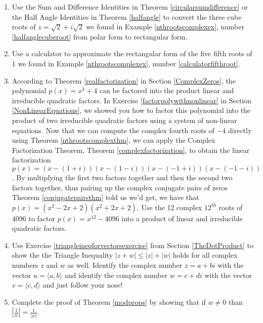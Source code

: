 \documentclass{ximera}
\begin{document}
\begin{enumerate}

\setcounter{enumi}{\value{HW}}

\item Use the Sum and Difference Identities in Theorem \ref{circularsumdifference} or the Half Angle Identities in Theorem \ref{halfangle} to convert the three cube roots of $z=\sqrt{2} + i\sqrt{2}$ we found in  Example \ref{nthrootscomplexex}, number \ref{halfanglecuberoot} from polar form to rectangular form.

\item Use a calculator to approximate the rectangular form of the five fifth roots of $1$ we found in Example \ref{nthrootscomplexex}, number \ref{calculatorfifthroot}.

\item According to Theorem \ref{realfactorization} in Section \ref{ComplexZeros}, the polynomial $p(x) = x^{4} + 4$ can be factored into the product linear and irreducible quadratic factors.  In Exercise \ref{factorpolywithnonlinear} in Section \ref{NonLinearEquations}, we showed you how to factor this polynomial into the product of two irreducible quadratic factors using a system of non-linear equations.  Now that we can compute the complex fourth roots of $-4$ directly using  Theorem \ref{nthrootscomplexthm}, we can  apply the Complex Factorization Theorem, Theorem \ref{complexfactorization}, to obtain the linear factorization $p(x) = (x - (1 + i))(x - (1 - i))(x - (-1 + i))(x - (-1 - i))$.  By multiplying the first two factors together and then the second two factors together, thus pairing up the complex conjugate pairs of zeros Theorem \ref{conjugatepairsthm} told us we'd get, we have that $p(x) = (x^{2} - 2x + 2)(x^{2} + 2x + 2)$.  Use the 12 complex $12^{\text{th}}$ roots of 4096 to factor $p(x) = x^{12} - 4096$ into a product of linear and irreducible quadratic factors.


\item Use Exercise \ref{triangleineqforvectorsexercise} from Section \ref{TheDotProduct} to show the the Triangle Inequality $|z + w| \leq |z| + |w|$ holds for all complex numbers $z$ and $w$ as well.  Identify the complex number $z = a + bi$ with the vector $u = \langle a, b \rangle$ and identify the complex number $w = c + di$ with the vector $v = \langle c, d \rangle$ and just follow your nose!


\item Complete the proof of Theorem \ref{modprops} by showing that if $w \neq 0$ than  $\left| \frac{1}{w}\right| = \frac{1}{|w|}$.


\end{enumerate}
\end{document}
